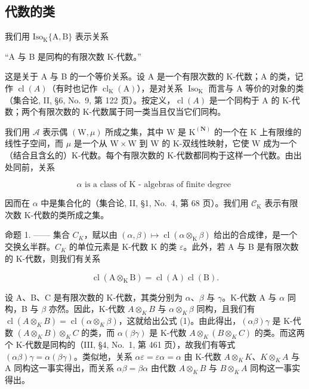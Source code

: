 \subsection{代数的类}

我们用 \(\mathrm{Iso}_{\mathrm{K}}\{\mathrm{A},\mathrm{B}\}\) 表示关系

“A 与 B 是同构的有限次数 K-代数。”

这是关于 A 与 B 的一个等价关系。设 A 是一个有限次数的 K-代数；A 的类，记作 \(\operatorname{cl}(A)\)（有时也记作 \(\operatorname{cl}_{\mathrm{K}}(\mathrm{A})\)），是对关系 \(\operatorname{Iso}_{\mathrm{K}}\) 而言与 A 等价的对象的类（集合论, II, §6, No.~9, 第 122 页）。按定义，\(\operatorname{cl}(A)\) 是一个同构于 A 的 K-代数；两个有限次数的 K-代数属于同一类当且仅当它们同构。

我们用 \(\mathcal{A}\) 表示偶 \((\mathrm{W},\mu)\) 所成之集，其中 \(\mathrm{W}\) 是 \(\mathrm{K}^{(\mathbf{N})}\) 的一个在 \(\mathrm{K}\) 上有限维的线性子空间，而 \(\mu\) 是一个从 \(\mathrm{W} \times \mathrm{W}\) 到 \(\mathrm{W}\) 的 K-双线性映射，它使 \(\mathrm{W}\) 成为一个（结合且含幺的）K-代数。每个有限次数的 K-代数都同构于这样一个代数。由出处同前，关系

\[
\alpha \text {   is   a   class   of   K - algebras   of   finite   degree }
\]

因而在 \(\alpha\) 中是集合化的（集合论, II, §1, No.~4, 第 68 页）。我们用 \(\mathcal{C}_{\mathrm{K}}\) 表示有限次数 K-代数的类所成之集。

命题 1. —— 集合 \(C_{K}\)，赋以由 \((\alpha, \beta) \mapsto \operatorname{cl}(\alpha \otimes_{\mathrm{K}} \beta)\) 给出的合成律，是一个交换幺半群。\(C_{K}\) 的单位元素是 K-代数 K 的类 \(\varepsilon\)。此外，若 A 与 B 是有限次数的 K-代数，则我们有关系

\[
\operatorname{cl} (\mathrm{A} \otimes_ {\mathrm{K}} \mathrm{B}) = \operatorname{cl} (\mathrm{A}) \operatorname{cl} (\mathrm{B}).\tag{1}
\]

设 A、B、C 是有限次数的 K-代数，其类分别为 \(\alpha\)、\(\beta\) 与 \(\gamma\)。K-代数 A 与 \(\alpha\) 同构，B 与 \(\beta\) 亦然。因此，K-代数 \(A \otimes_{K} B\) 与 \(\alpha \otimes_{K} \beta\) 同构，且我们有 \(\operatorname{cl}(A \otimes_{K} B) = \operatorname{cl}(\alpha \otimes_{K} \beta)\)，这就给出公式 (1)。由此得出，\((\alpha\beta)\gamma\) 是 K-代数 \((A \otimes_{K} B) \otimes_{K} C\) 的类，而 \(\alpha(\beta\gamma)\) 是 K-代数 \(A \otimes_{K} (B \otimes_{K} C)\) 的类。而这两个 K-代数是同构的（III, §4, No.~1, 第 461 页），故我们有等式 \((\alpha\beta)\gamma = \alpha(\beta\gamma)\)。类似地，关系 \(\alpha\varepsilon = \varepsilon\alpha = \alpha\) 由 K-代数 \(A \otimes_{K} K\)、\(K \otimes_{K} A\) 与 A 同构这一事实得出，而关系 \(\alpha\beta = \beta\alpha\) 由代数 \(A \otimes_{K} B\) 与 \(B \otimes_{K} A\) 同构这一事实得出。

